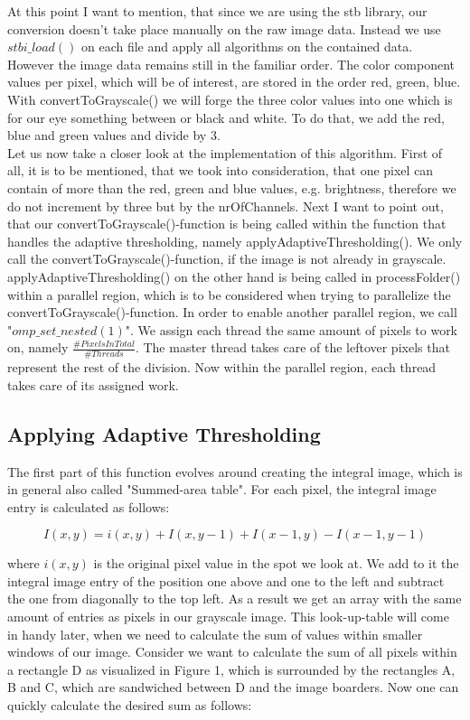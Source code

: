 \documentclass[sigconf]{acmart}
\begin{document}
At this point I want to mention, that since we are using the stb library, our conversion doesn't take place manually on the raw image data. Instead we use $stbi\_load()$ on each file and apply all algorithms on the contained data. However the image data remains still in the familiar order. The color component values per pixel, which will be of interest, are stored in the order red, green, blue. With convertToGrayscale() we will forge the three color values into one which is for our eye something between or black and white. To do that, we add the red, blue and green values and divide by 3. \\

Let us now take a closer look at the implementation of this algorithm. First of all, it is to be mentioned, that we took into consideration, that one pixel can contain of more than the red, green and blue values, e.g. brightness, therefore we do not increment by three but by the nrOfChannels. Next I want to point out, that our convertToGrayscale()-function is being called within the function that handles the adaptive thresholding, namely applyAdaptiveThresholding(). We only call the convertToGrayscale()-function, if the image is not already in grayscale. applyAdaptiveThresholding() on the other hand is being called in processFolder() within a parallel region, which is to be considered when trying to parallelize the convertToGrayscale()-function. In order to enable another parallel region, we call "$omp\_set\_nested(1)$". We assign each thread the same amount of pixels to work on, namely $\frac{\#PixelsInTotal}{\#Threads}$. The master thread takes care of the leftover pixels that represent the rest of the division. Now within the parallel region, each thread takes care of its assigned work. 

\subsection{Applying Adaptive Thresholding}

The first part of this function evolves around creating the integral image, which is in general also called "Summed-area table". For each pixel, the integral image entry is calculated as follows:\cite{LecSource2}

\begin{equation}
{\displaystyle I(x,y)=i(x,y)+I(x,y-1)+I(x-1,y)-I(x-1,y-1)}
\end{equation}

where $i(x,y)$ is the original pixel value in the spot we look at. We add to it the integral image entry of the position one above and one to the left and subtract the one from diagonally to the top left. As a result we get an array with the same amount of entries as pixels in our grayscale image. This look-up-table will come in handy later, when we need to calculate the sum of values within smaller windows of our image. Consider we want to calculate the sum of all pixels within a rectangle D as visualized in Figure 1, which is surrounded by the rectangles A, B and C, which are sandwiched between D and the image boarders.
Now one can quickly calculate the desired sum as follows:
\end{document}
